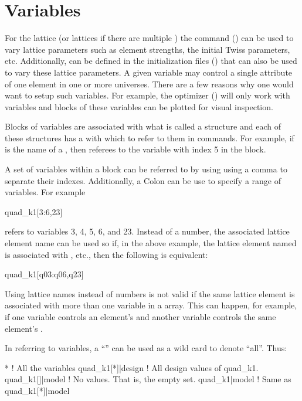 \chapter{Variables}
\label{c:var}

For the  lattice (or lattices if there are multiple ) the
 command () can be used to vary lattice parameters such as
element strengths, the initial Twiss parameters, etc.  Additionally,  can be
defined in the \tao initialization files () that can also be used to vary
these  lattice parameters.  A given \tao variable may control a single attribute
of one element in one or more universes.  There are a few reasons why one would want to
setup such variables.  For example, the optimizer () will only work with
\tao variables and blocks of these variables can be plotted for visual inspection.

Blocks of variables are associated with what is called a 
structure and each of these structures has a  with which to
refer to them in \tao commands. For example, if  is the
name of a , then  referees to the variable 
with index 5 in the block. 

A set of variables within a  block
can be referred to by using using a comma \vn{,} to
separate their indexes. Additionally, a Colon \vn{:} can be use to
specify a range of variables. For example
\begin{example}
  quad_k1[3:6,23]
\end{example}
refers to variables 3, 4, 5, 6, and 23. Instead of a number, the
associated lattice element name can be used so if, in the above
example, the lattice element named  is associated with
, etc., then the following is equivalent:
\begin{example}
  quad_k1[q03:q06,q23]
\end{example}
Using lattice names instead of numbers is not valid if the same
lattice element is associated with more than one variable in a
 array. This can happen, for example, if one variable controls
an element's  and another variable controls the same element's
. 

In referring to variables, a ``\vn{*}'' can be used as a wild card to 
denote ``all''. Thus:
\begin{example}
  *                 ! All the variables
  quad_k1[*]|design ! All design values of quad_k1.
  quad_k1[]|model   ! No values. That is, the empty set.
  quad_k1|model     ! Same as quad_k1[*]|model
\end{example}

